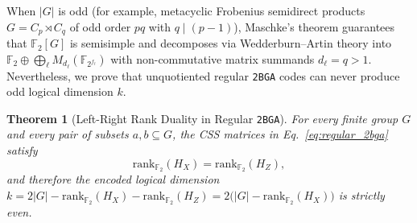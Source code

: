 \documentclass[aps,prapplied,reprint,longbibliography]{revtex4-2}
\newtheorem{theorem}{Theorem}
\begin{document}
When $|G|$ is odd (for example, metacyclic Frobenius semidirect products $G = C_p \rtimes C_q$ of odd order $pq$ with $q \mid (p-1)$), Maschke's theorem guarantees that $\mathbb{F}_2[G]$ is semisimple and decomposes via Wedderburn--Artin theory into $\mathbb{F}_2 \oplus \bigoplus_\ell M_{d_\ell}(\mathbb{F}_{2^{f_\ell}})$ with non-commutative matrix summands $d_\ell = q > 1$. Nevertheless, we prove that unquotiented regular \texttt{2BGA} codes can never produce odd logical dimension $k$.

\begin{theorem}[Left-Right Rank Duality in Regular \texttt{2BGA}]
\label{thm:rank_duality}
For every finite group $G$ and every pair of subsets $a, b \subseteq G$, the CSS matrices in Eq.~\eqref{eq:regular_2bga} satisfy
\begin{equation}
\mathrm{rank}_{\mathbb{F}_2}(H_X) = \mathrm{rank}_{\mathbb{F}_2}(H_Z),
\label{eq:rank_equality}
\end{equation}
and therefore the encoded logical dimension $k = 2|G| - \mathrm{rank}_{\mathbb{F}_2}(H_X) - \mathrm{rank}_{\mathbb{F}_2}(H_Z) = 2\bigl(|G| - \mathrm{rank}_{\mathbb{F}_2}(H_X)\bigr)$ is strictly even.
\end{theorem}
\end{document}
